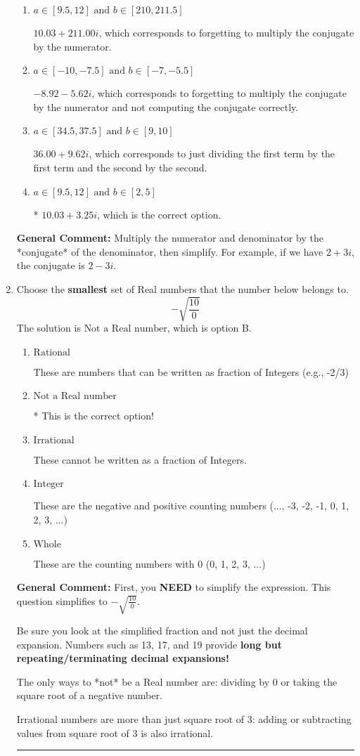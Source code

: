 \documentclass{extbook}[14pt]
\newcommand{\litem}[1]{\item #1

\rule{\textwidth}{0.4pt}}
\begin{document}
\begin{enumerate}
{\begin{enumerate}[label=\Alph*.]
 $652.00  + 3.25 i$, which corresponds to forgetting to multiply the conjugate by the numerator and using a plus instead of a minus in the denominator.
\item \( a \in [9.5, 12] \text{ and } b \in [210, 211.5] \)

 $10.03  + 211.00 i$, which corresponds to forgetting to multiply the conjugate by the numerator.
\item \( a \in [-10, -7.5] \text{ and } b \in [-7, -5.5] \)

 $-8.92  - 5.62 i$, which corresponds to forgetting to multiply the conjugate by the numerator and not computing the conjugate correctly.
\item \( a \in [34.5, 37.5] \text{ and } b \in [9, 10] \)

 $36.00  + 9.62 i$, which corresponds to just dividing the first term by the first term and the second by the second.
\item \( a \in [9.5, 12] \text{ and } b \in [2, 5] \)

* $10.03  + 3.25 i$, which is the correct option.
\end{enumerate}

\textbf{General Comment:} Multiply the numerator and denominator by the *conjugate* of the denominator, then simplify. For example, if we have $2+3i$, the conjugate is $2-3i$.
}
\litem{
Choose the \textbf{smallest} set of Real numbers that the number below belongs to.
\[ -\sqrt{\frac{10}{0}} \]The solution is \( \text{Not a Real number} \), which is option B.\begin{enumerate}[label=\Alph*.]
\item \( \text{Rational} \)

These are numbers that can be written as fraction of Integers (e.g., -2/3)
\item \( \text{Not a Real number} \)

* This is the correct option!
\item \( \text{Irrational} \)

These cannot be written as a fraction of Integers.
\item \( \text{Integer} \)

These are the negative and positive counting numbers (..., -3, -2, -1, 0, 1, 2, 3, ...)
\item \( \text{Whole} \)

These are the counting numbers with 0 (0, 1, 2, 3, ...)
\end{enumerate}

\textbf{General Comment:} First, you \textbf{NEED} to simplify the expression. This question simplifies to $-\sqrt{\frac{10}{0}}$. 
 
 Be sure you look at the simplified fraction and not just the decimal expansion. Numbers such as 13, 17, and 19 provide \textbf{long but repeating/terminating decimal expansions!} 
 
 The only ways to *not* be a Real number are: dividing by 0 or taking the square root of a negative number. 
 
 Irrational numbers are more than just square root of 3: adding or subtracting values from square root of 3 is also irrational.
}
\end{enumerate}
\end{document}
